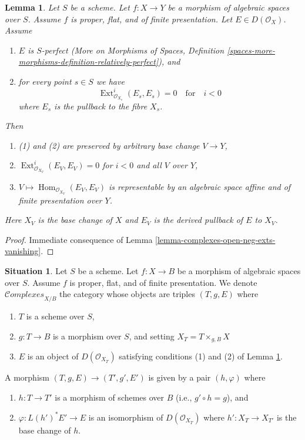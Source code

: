 \documentclass{stacks-project}
\theoremstyle{plain}
\newtheorem{lemma}[subsection]{Lemma}
\theoremstyle{definition}
\newtheorem{situation}[subsection]{Situation}
\theoremstyle{remark}
\numberwithin{equation}{subsection}
\def\Hom{\mathop{\mathrm{Hom}}\nolimits}
\def\Ext{\mathop{\mathrm{Ext}}\nolimits}
\def\Complexesstack{\mathcal{C}\!\mathit{omplexes}}
\begin{document}
\begin{lemma}
\label{lemma-complexes}
Let $S$ be a scheme. Let $f : X \to Y$ be a morphism of algebraic
spaces over $S$. Assume $f$ is proper, flat, and of finite presentation.
Let $E \in D(\mathcal{O}_X)$.
Assume
\begin{enumerate}
\item $E$ is $S$-perfect (More on Morphisms of Spaces, Definition
\ref{spaces-more-morphisms-definition-relatively-perfect}), and
\item for every point $s \in S$ we have
$$
\Ext^i_{\mathcal{O}_{X_s}}(E_s, E_s) = 0
\quad\text{for}\quad i < 0
$$
where $E_s$ is the pullback to the fibre $X_s$.
\end{enumerate}
Then
\begin{enumerate}
\item[(a)] (1) and (2) are preserved by arbitrary base change $V \to Y$,
\item[(b)] $\Ext^i_{\mathcal{O}_{X_V}}(E_V, E_V) = 0$ for $i < 0$
and all $V$ over $Y$,
\item[(c)] $V \mapsto \Hom_{\mathcal{O}_{X_V}}(E_V, E_V)$ is representable
by an algebraic space affine and of finite presentation over $Y$.
\end{enumerate}
Here $X_V$ is the base change of $X$ and $E_V$ is the derived pullback
of $E$ to $X_V$.
\end{lemma}

\begin{proof}
Immediate consequence of Lemma \ref{lemma-complexes-open-neg-exts-vanishing}.
\end{proof}

\begin{situation}
\label{situation-complexes}
Let $S$ be a scheme. Let $f : X \to B$ be a morphism of algebraic spaces
over $S$. Assume $f$ is proper, flat, and of finite presentation.
We denote $\Complexesstack_{X/B}$ the category whose objects are
triples $(T, g, E)$ where
\begin{enumerate}
\item $T$ is a scheme over $S$,
\item $g : T \to B$ is a morphism over $S$, and setting
$X_T = T \times_{g, B} X$
\item $E$ is an object of $D(\mathcal{O}_{X_T})$ satisfying
conditions (1) and (2) of Lemma \ref{lemma-complexes}.
\end{enumerate}
A morphism $(T, g, E) \to (T', g', E')$
is given by a pair $(h, \varphi)$ where
\begin{enumerate}
\item $h : T \to T'$ is a morphism of schemes over $B$
(i.e., $g' \circ h = g$), and
\item $\varphi : L(h')^*E' \to E$ is an
isomorphism of $D(\mathcal{O}_{X_T})$ where $h' : X_T \to X_{T'}$
is the base change of $h$.
\end{enumerate}
\end{situation}
\end{document}

